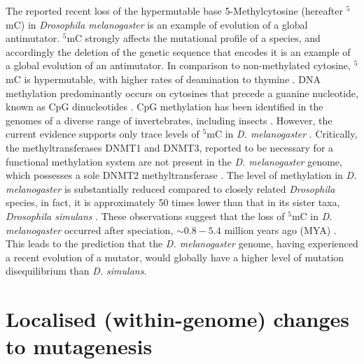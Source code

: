 The reported recent loss of the hypermutable base 5-Methylcytosine (hereafter $^5$mC) in \textit{Drosophila melanogaster} is an example of evolution of a global antimutator. 
$^5$mC strongly affects the mutational profile of a species, and accordingly the deletion of the genetic sequence that encodes it is an example of a global evolution of an antimutator. In comparison to non-methylated cytosine, $^5$mC is hypermutable, with higher rates of deamination to thymine \citep{Coulondre1978MolecularColi}. DNA methylation predominantly occurs on cytosines that precede a guanine nucleotide, known as CpG dinucleotides \citep{Holliday1975DNADevelopment}. CpG methylation has been identified in the genomes of a diverse range of invertebrates, including insects \citep{Wang2010EstimatingLoci}. However, the current evidence supports only trace levels of $^5$mC in \textit{D. melanogaster} \citep{Capuano2014CytosineSpecies, Deshmukh2018LevelsGenome}. Critically, the methyltransferases DNMT1 and DNMT3, reported to be necessary for a functional methylation system are not present in the \textit{D. melanogaster} genome, which possesses a sole DNMT2 methyltransferase \citep{Goll2005EukaryoticMethyltransferases, Tweedie1999VestigesMelanogaster}. The level of methylation in \textit{D. melanogaster} is substantially reduced compared to closely related \textit{Drosophila} species, in fact, it is approximately 50 times lower than that in its sister taxa, \textit{Drosophila simulans} \citep{Deshmukh2018LevelsGenome}. These observations suggest that the loss of $^5$mC in \textit{D. melanogaster} occurred after speciation, $\sim 0.8-5.4$ million years ago (MYA) \citep{Cutter2008DivergenceRate, Wang2010EstimatingLoci, Tamura2004TemporalClocks}. This leads to the prediction that the \textit{D. melanogaster} genome, having experienced a recent evolution of a mutator, would globally have a higher level of mutation disequilibrium than \textit{D. simulans}. 

\section{Localised (within-genome) changes to mutagenesis}

